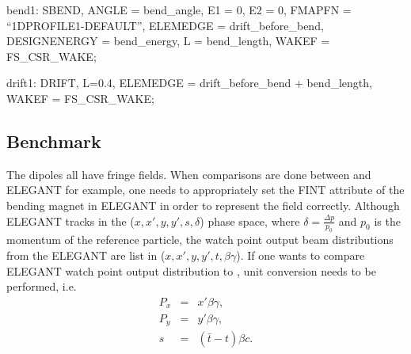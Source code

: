 \begin{description}
\item[Example:]
\item \begin{example}
      bend1: SBEND, ANGLE = bend_angle,
      E1 = 0, E2 = 0,
      FMAPFN = ``1DPROFILE1-DEFAULT'',
      ELEMEDGE = drift_before_bend,
      DESIGNENERGY = bend_energy,
      L = bend_length,
      WAKEF = FS_CSR_WAKE;
      \end{example}
\item  \begin{example}
       drift1: DRIFT, L=0.4, ELEMEDGE = drift_before_bend +
       bend_length, WAKEF = FS_CSR_WAKE;
       \end{example}
\end{description}

\subsection{Benchmark}
The \opal dipoles all have fringe fields. When comparisons are done between \opal and ELEGANT \cite{elegant} for example, one needs to appropriately set the FINT attribute of the bending magnet in ELEGANT in order to represent the field correctly. Although ELEGANT tracks in the ($x, x', y, y', s, \delta$) phase space, where $\delta = \frac{\Delta p}{p_0}$ and $p_0$ is the momentum of the reference particle, the watch point output beam distributions from the ELEGANT are list in ($x, x', y, y', t, \beta\gamma$). If one wants to compare ELEGANT watch point output distribution to \opal, unit conversion needs to be performed, i.e.
\begin{eqnarray*}
P_x &=& x'\beta\gamma, \\ P_y &=& y'\beta\gamma, \\ s &=& (\bar t-t)\beta c .
\end{eqnarray*}


